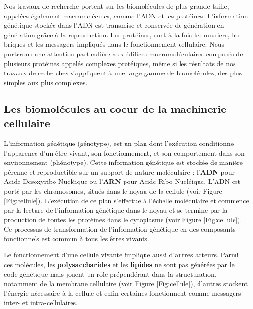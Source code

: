 Nos travaux de recherche portent sur les biomolécules de plus grande taille, appelées également macromolécules, comme l'ADN et les protéines. L'information génétique stockée dans l'ADN est transmise et conservée de génération en génération grâce à la reproduction. Les protéines, sont à la fois les ouvriers, les briques et les messagers impliqués dans le fonctionnement cellulaire. Nous porterons une attention particulière aux édifices macromoléculaires composés de plusieurs protéines appelés complexes protéiques, même si les résultats de nos travaux de recherches s'appliquent à une large gamme de biomolécules, des plus simples aux plus complexes.

\subsection{Les biomolécules au coeur de la machinerie cellulaire}

L'information génétique (génotype), est un plan dont l'exécution conditionne l'apparence d'un être vivant, son fonctionnement, et son comportement dans son environnement (phénotype). Cette information génétique est stockée de manière pérenne et reproductible sur un support de nature moléculaire : l'\textbf{ADN} pour Acide Desoxyribo-Nucléique ou l'\textbf{ARN} pour Acide Ribo-Nucléique. L'ADN est porté par les chromosomes, situés dans le noyau de la cellule (voir Figure \ref{Fig:cellule}).
L'exécution de ce plan s'effectue à l'échelle moléculaire et commence par la lecture de l'information génétique dans le noyau et se termine par la production de toutes les protéines dans le cytoplasme (voir Figure \ref{Fig:cellule}). Ce processus de transformation de l'information génétique en des composants fonctionnels est commun à tous les êtres vivants.

Le fonctionnement d'une cellule vivante implique aussi d'autres acteurs. Parmi ces molécules, les \textbf{polysaccharides} et les \textbf{lipides} ne sont pas générées par le code génétique mais jouent un rôle prépondérant dans la structuration, notamment de la membrane cellulaire (voir Figure \ref{Fig:cellule}), d'autres stockent l'énergie nécessaire à la cellule et enfin certaines fonctionnent comme messagers inter- et intra-cellulaires.



